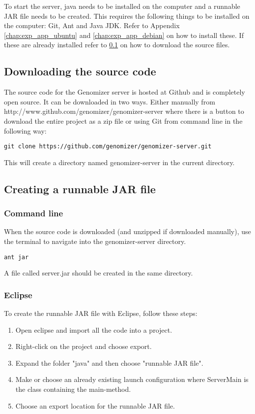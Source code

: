 To start the server, java needs to be installed on the computer and a runnable JAR file needs to be created.
This requires the following things to be installed on the computer: Git, Ant and Java JDK. 
Refer to Appendix \ref{chap:exp_app_ubuntu} and \ref{chap:exp_app_debian} on how to install these.
If these are already installed refer to \ref{sec:com_download} on how to download the source files.
\subsection{Downloading the source code}
\label{sec:com_download}
The source code for the Genomizer server is hosted at Github and is completely open source. It can be downloaded in
two ways. Either manually from http://www.github.com/genomizer/genomizer-server where there is a button to
download the entire project as a zip file or using Git from command line in the following way:
\begin{verbatim}
git clone https://github.com/genomizer/genomizer-server.git
\end{verbatim}
This will create a directory named genomizer-server in the current directory.
\subsection{Creating a runnable JAR file}
\label{sec:com_makejar}
\subsubsection{Command line}
When the source code is downloaded (and unzipped if downloaded manually), use the terminal to navigate into
the genomizer-server directory.
\begin{verbatim}
ant jar
\end{verbatim}
A file called server.jar should be created in the same directory.
\subsubsection{Eclipse}
\label{sec:com_UsingEclipse}
To create the runnable JAR file with Eclipse, follow these steps:
\begin{enumerate}
\item Open eclipse and import all the code into a project.
\item Right-click on the project and choose export.
\item Expand the folder "java" and then choose "runnable JAR file".
\item Make or choose an already existing launch configuration where ServerMain is the class containing the main-method.
\item Choose an export location for the runnable JAR file.
\end{enumerate}

